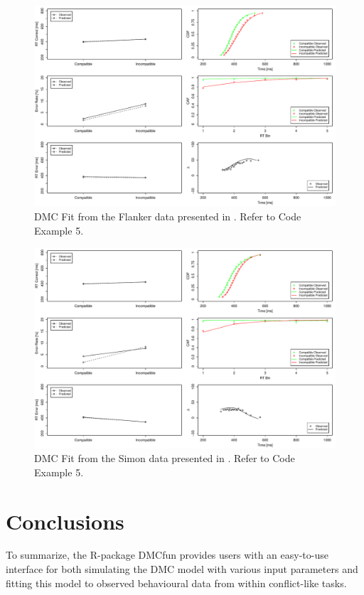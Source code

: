 \begin{figure}[H]
    \includegraphics[width=1\textwidth]{../figures/figure5.pdf}
    \caption{DMC Fit from the Flanker data presented in \textcite{ulrich2015automatic}. Refer to Code Example 5.}
    \label{fig:5}
\end{figure}

\begin{figure}[H]
    \includegraphics[width=1\textwidth]{../figures/figure6.pdf}
    \caption{DMC Fit from the Simon data presented in \textcite{ulrich2015automatic}. Refer to Code Example 5.}
    \label{fig:6}
\end{figure}

\section{Conclusions}
\label{summary}
To summarize, the R-package DMCfun provides users with an easy-to-use interface
for both simulating the DMC model with various input parameters and fitting
this model to observed behavioural data from within conflict-like tasks. 

